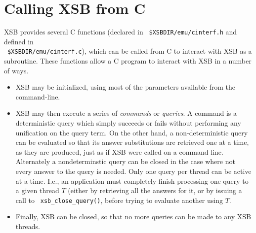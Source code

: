 %
\section{Calling XSB from C}

XSB provides several C functions (declared in {\tt
  \$XSBDIR/emu/cinterf.h} and defined in \\ {\tt
  \$XSBDIR/emu/cinterf.c}), which can be called from C to interact
with XSB as a subroutine. These functions allow a C program to
interact with XSB in a number of ways.
\begin{itemize}
\item XSB may be initialized, using most of the parameters available
  from the command-line. 
%
\item XSB may then execute a series of {\em commands} or {\em
  queries}.  A command is a deterministic query which simply succeeds
  or fails without performing any unification on the query term.  On
  the other hand, a non-deterministic query can be evaluated so that
  its answer substitutions are retrieved one at a time, as they are
  produced, just as if XSB were called on a command line.  Alternately
  a nondeterminstic query can be closed in the case where not every
  answer to the query is needed.  Only one query per thread can be
  active at a time.  I.e., an application must completely finish
  processing one query to a given thread $T$ (either by retrieving all
  the answers for it, or by issuing a call to {\tt
    xsb\_close\_query()}, before trying to evaluate another using $T$.
%
\item Finally, XSB can be closed, so that no more queries can be made
  to any XSB threads.
\end{itemize}

